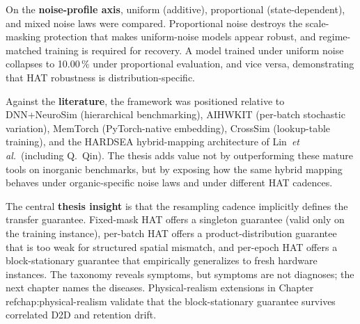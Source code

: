 On the \textbf{noise-profile axis}, uniform (additive), proportional (state-dependent), and mixed noise laws were compared. Proportional noise destroys the scale-masking protection that makes uniform-noise models appear robust, and regime-matched training is required for recovery. A model trained under uniform noise collapses to 10.00\,\% under proportional evaluation, and vice versa, demonstrating that HAT robustness is distribution-specific.

Against the \textbf{literature}, the framework was positioned relative to DNN+NeuroSim (hierarchical benchmarking), AIHWKIT (per-batch stochastic variation), MemTorch (PyTorch-native embedding), CrossSim (lookup-table training), and the HARDSEA hybrid-mapping architecture of Lin~\emph{et al.}~(including Q.~Qin). The thesis adds value not by outperforming these mature tools on inorganic benchmarks, but by exposing how the same hybrid mapping behaves under organic-specific noise laws and under different HAT cadences.

The central \textbf{thesis insight} is that the resampling cadence implicitly defines the transfer guarantee. Fixed-mask HAT offers a singleton guarantee (valid only on the training instance), per-batch HAT offers a product-distribution guarantee that is too weak for structured spatial mismatch, and per-epoch HAT offers a block-stationary guarantee that empirically generalizes to fresh hardware instances. The taxonomy reveals symptoms, but symptoms are not diagnoses; the next chapter names the diseases.  Physical-realism extensions in Chapter~\\ref{chap:physical-realism} validate that the block-stationary guarantee survives correlated D2D and retention drift.

